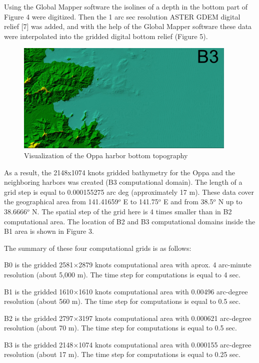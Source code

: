 \documentclass{aip-cp}
\begin{document}
Using the Global Mapper software the isolines of a depth in the bottom part 
of Figure 4 were digitized. Then the 1 arc sec resolution ASTER GDEM digital 
relief [7] was added, and with the help of the Global Mapper software these 
data were interpolated into the gridded digital bottom relief (Figure 5).

\begin{figure}[h]
  \centerline{\includegraphics[width=300pt]{art/Fig_05.png}}
  \caption{Visualization of the Oppa harbor bottom topography}
\end{figure}

As a result, the 2148x1074 knots gridded bathymetry for the Oppa and the 
neighboring harbors was created (B3 computational domain). The length of a 
grid step is equal to 0.000155275 arc deg (approximately 17 m). These data 
cover the geographical area from 141.41659$^{o}$ E to 141.75$^{o}$ E and 
from 38.5$^{o}$ N up to 38.6666$^{o}$ N. The spatial step of the grid here 
is 4 times smaller than in B2 computational area. The location of B2 and B3 
computational domains inside the B1 area is shown in Figure 3.

The summary of these four computational grids is as follows:


B0 is the gridded 2581$\times$2879 knots computational area with aprox. 4 
arc-minute resolution (about 5,000 m). The time step for computations is 
equal to 4 sec.


B1 is the gridded 1610$\times$1610 knots computational area with 0.00496 arc-degree 
resolution (about 560 m). The time step for computations is equal to 0.5 
sec.


B2 is the gridded 2797$\times$3197 knots computational area with 0.000621 
arc-degree resolution (about 70 m). The time step for computations is equal 
to 0.5 sec.


B3 is the gridded 2148$\times$1074 knots computational area with 0.000155 
arc-degree resolution (about 17 m). The time step for computations is equal 
to 0.25 sec.
\end{document}
